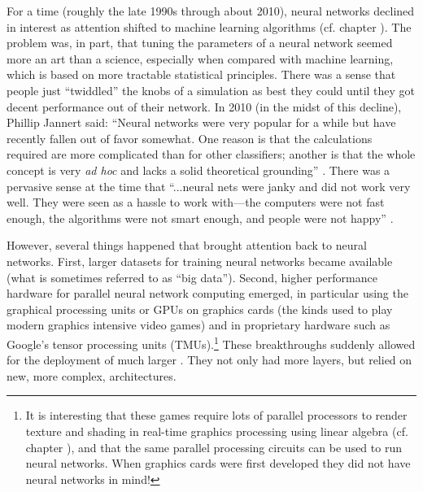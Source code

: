 For a time (roughly the late 1990s through about 2010), neural networks declined in interest as attention shifted to machine learning algorithms (cf. chapter ). The problem was, in part, that tuning the parameters of a neural network seemed more an art than a science, especially when compared with machine learning, which is based on more tractable statistical principles. There was a sense that people just ``twiddled''  the knobs of a simulation as best they could until they got decent performance out of their network. In 2010 (in the midst of this decline), Phillip Jannert said: ``Neural networks were very popular for a while but have recently fallen out of favor somewhat. One reason is that the calculations required are more complicated than for other classifiers; another is that the whole concept is very \emph{ad hoc} and lacks a solid theoretical grounding'' \cite[Ch. 18]{janert2010data}.  There was a pervasive sense at the time that ``...neural nets were janky and did not work very well. They were seen as a hassle to work with---the computers were not fast enough, the algorithms were not smart enough, and people were not happy'' \cite{kurenkov2020briefhistory}.

However, several things happened that brought attention back to neural networks. First, larger datasets for training neural networks became available (what is sometimes referred to as ``big data''). Second, higher performance hardware for parallel neural network computing emerged, in particular using the graphical processing units or GPUs on graphics cards (the kinds used to play modern graphics intensive video games) and in proprietary hardware such as Google's tensor processing units (TMUs).\footnote{It is interesting that these games require lots of parallel processors to render texture and shading in real-time graphics processing using linear algebra (cf. chapter ), and that the same parallel processing circuits can be used to run neural networks. When graphics cards were first developed they did not have neural networks in mind!} These breakthroughs suddenly allowed for the deployment of much larger . They not only had more layers, but relied on new, more complex, architectures.

